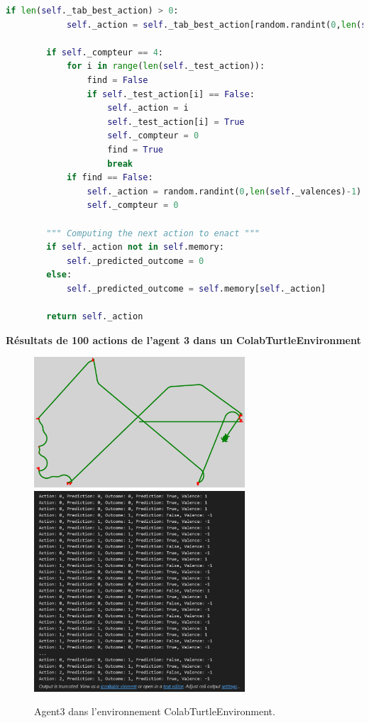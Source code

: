 \documentclass[a4paper, 12pt]{article}
\begin{document}
\begin{lstlisting}[language=Python, caption={Implementation de l'Agent3}]
        if len(self._tab_best_action) > 0:
            self._action = self._tab_best_action[random.randint(0,len(self._tab_best_action)-1)]
        
        if self._compteur == 4:
            for i in range(len(self._test_action)):
                find = False
                if self._test_action[i] == False:
                    self._action = i
                    self._test_action[i] = True
                    self._compteur = 0
                    find = True
                    break
            if find == False:
                self._action = random.randint(0,len(self._valences)-1)
                self._compteur = 0
        
        """ Computing the next action to enact """
        if self._action not in self.memory:
            self._predicted_outcome = 0
        else:
            self._predicted_outcome = self.memory[self._action]
            
        return self._action
\end{lstlisting}

\newpage

\noindent \large \textbf{Résultats de 100 actions de l'agent 3 dans un ColabTurtleEnvironment}
\normalsize

\begin{figure}[h]
    \centering
    \includegraphics[width=0.7\textwidth]{ReportImages/Agent3/Agent3_tortue.png}
    \includegraphics[width=0.7\textwidth]{ReportImages/Agent3/Agent3_100_actions.png}
    \caption{Agent3 dans l'environnement ColabTurtleEnvironment.}
\end{figure}
\end{document}
